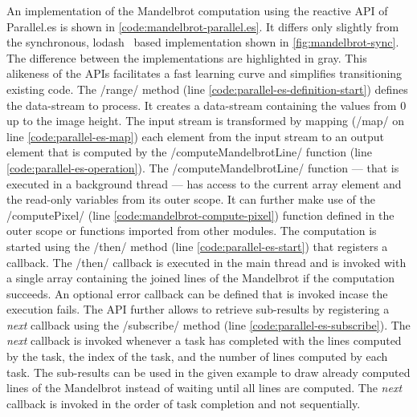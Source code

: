  An implementation of the Mandelbrot computation using the reactive API of Parallel.es is shown in \cref{code:mandelbrot-parallel.es}. It differs only slightly from the synchronous, lodash~\cite{lodash} based implementation shown in \cref{fig:mandelbrot-sync}. The difference between the implementations are highlighted in gray. This alikeness of the APIs facilitates a fast learning curve and simplifies transitioning existing code. The \javascriptinline/range/ method (line \ref{code:parallel-es-definition-start}) defines the data-stream to process. It creates a data-stream containing the values from 0 up to the image height. The input stream is transformed by mapping (\javascriptinline/map/ on line \ref{code:parallel-es-map}) each element from the input stream to an output element that is computed by the \javascriptinline/computeMandelbrotLine/ function (line \ref{code:parallel-es-operation}). The \javascriptinline/computeMandelbrotLine/ function --- that is executed in a background thread --- has access to the current array element and the read-only variables from its outer scope. It can further make use of the \javascriptinline/computePixel/ (line \ref{code:mandelbrot-compute-pixel}) function defined in the outer scope or functions imported from other modules. The computation is started using the \javascriptinline/then/ method (line \ref{code:parallel-es-start}) that registers a callback. The \javascriptinline/then/ callback is executed in the main thread and is invoked with a single array containing the joined lines of the Mandelbrot if the computation succeeds. An optional error callback can be defined that is invoked incase the execution fails. The API further allows to retrieve sub-results by registering a \textit{next} callback using the \javascriptinline/subscribe/ method (line \ref{code:parallel-es-subscribe}). The \textit{next} callback is invoked whenever a task has completed with the lines computed by the task, the index of the task, and the number of lines computed by each task. The sub-results can be used in the given example to draw already computed lines of the Mandelbrot instead of waiting until all lines are computed. The \textit{next} callback is invoked in the order of task completion and not sequentially. 
 
